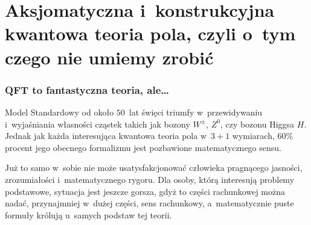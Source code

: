 \documentclass[10pt,t]{beamer}
\begin{document}
\section{Aksjomatyczna i~konstrukcyjna kwantowa teoria pola,
  czyli o~tym czego nie umiemy zrobić}



\begin{frame}
  \frametitle{QFT to fantastyczna teoria, ale\ldots}


  Model Standardowy od około $50$~lat święci triumfy w~przewidywaniu
  i~wyjaśniania własności cząstek takich jak bozony $W^{ \pm }$,
  $Z^{ 0 }$, czy bozonu Higgsa $H$. Jednak jak każda interesująca kwantowa
  teoria pola w~$3 + 1$ wymiarach, $60\%$ procent jego obecnego formalizmu
  jest pozbawione matematycznego sensu.

  Już to samo w~sobie nie może usatysfakcjonować człowieka pragnącego
  jasności, zrozumiałości i~matematycznego rygoru. Dla osoby, którą
  interesują problemy podstawowe, sytuacja jest jeszcze gorsza, gdyż
  to części rachunkowej można nadać, przynajmniej w~dużej części,
  sens rachunkowy, a~matematycznie puste formuły królują u~samych podstaw
  tej teorii.

\end{frame}
\end{document}
